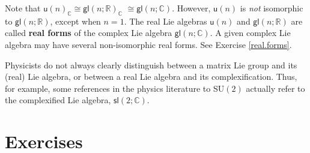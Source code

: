\documentclass{amsbook}
\theoremstyle{plain}
\numberwithin{equation}{chapter}
\numberwithin{theorem}{chapter}
\begin{document}
Note that $\mathsf{u}(n)_{\mathbb{C}}\cong\mathsf{gl}\left(  n;\mathbb{R}%
\right)  _{\mathbb{C}}$ $\cong\mathsf{gl}(n;\mathbb{C})$. However,
$\mathsf{u}(n)$ is \textit{not} isomorphic to $\mathsf{gl}\left(
n;\mathbb{R}\right)  $, except when $n=1$. The real Lie algebras
$\mathsf{u}(n)$ and $\mathsf{gl}\left(  n;\mathbb{R}\right)  $ are called
\textbf{real forms} of the complex Lie algebra $\mathsf{gl}(n;\mathbb{C})$. A
given complex Lie algebra may have several non-isomorphic real forms. See
Exercise \ref{real.forms}.

Physicists do not always clearly distinguish between a matrix Lie group and
its (real) Lie algebra, or between a real Lie algebra and its
complexification. Thus, for example, some references in the physics literature
to \textsf{SU}$(2)$ actually refer to the complexified Lie algebra,
$\mathsf{sl}(2;\mathbb{C})$.

\section{Exercises}
\end{document}
